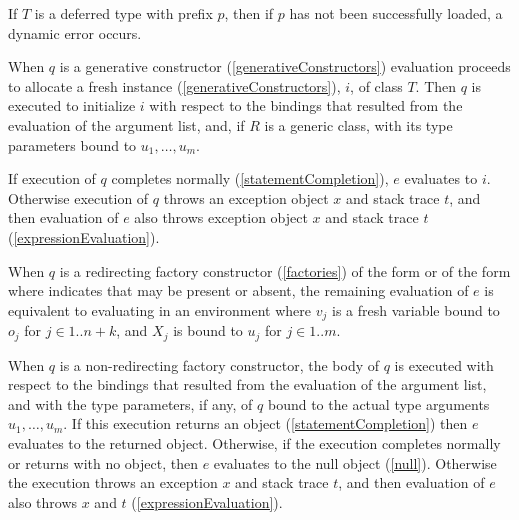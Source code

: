 \documentclass[makeidx]{article}
\begin{document}
{\LMHash{}%
If $T$ is a deferred type with prefix $p$,
then if $p$ has not been successfully loaded,
a dynamic error occurs.
\EndCase

\LMHash{}%
When $q$ is a generative constructor
(\ref{generativeConstructors})
evaluation proceeds to allocate a fresh instance
(\ref{generativeConstructors}), $i$, of class $T$.
Then $q$ is executed to initialize $i$ with respect to
the bindings that resulted from the evaluation of the argument list, and,
if $R$ is a generic class,
with its type parameters bound to $u_1, \ldots, u_m$.

\LMHash{}%
If execution of $q$ completes normally (\ref{statementCompletion}), $e$ evaluates to $i$.
Otherwise execution of $q$ throws an exception object $x$ and stack trace $t$,
and then evaluation of $e$ also throws exception object $x$ and stack trace $t$
(\ref{expressionEvaluation}).
\EndCase

\LMHash{}%
When $q$ is a redirecting factory constructor
(\ref{factories})
of the form  or
of the form 
where  indicates that \CONST{} may be present or absent,
the remaining evaluation of $e$ is equivalent to
evaluating
in an environment where
$v_j$ is a fresh variable bound to $o_j$ for $j \in 1 .. n + k$, and
$X_j$ is bound to $u_j$ for $j \in 1 .. m$.
\EndCase

\LMHash{}%
When $q$ is a non-redirecting factory constructor,
the body of $q$ is executed with respect to
the bindings that resulted from the evaluation of the argument list,
and with the type parameters, if any, of $q$ bound to
the actual type arguments $u_1, \ldots, u_m$.
If this execution returns an object
(\ref{statementCompletion})
then $e$ evaluates to the returned object.
Otherwise, if the execution completes normally or returns with no object,
then $e$ evaluates to the null object (\ref{null}).
Otherwise the execution throws an exception $x$ and stack trace $t$,
and then evaluation of $e$ also throws $x$ and $t$
(\ref{expressionEvaluation}).

}
\end{document}
